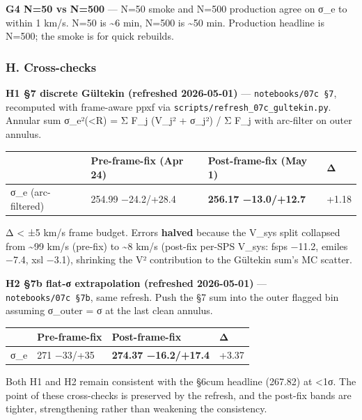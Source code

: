 \documentclass[
  10pt,
]{article}
\begin{document}
\textbf{G4 N=50 vs N=500} --- N=50 smoke and N=500 production agree on σ\_e to within 1 km/s. N=50 is \textasciitilde6 min, N=500 is \textasciitilde50 min. Production headline is N=500; the smoke is
for quick rebuilds.

\hypertarget{h.-cross-checks}{%
\subsubsection{H. Cross-checks}\label{h.-cross-checks}}

\textbf{H1 §7 discrete Gültekin (refreshed 2026-05-01)} --- \texttt{notebooks/07c\ §7}, recomputed with frame-aware ppxf via \texttt{scripts/refresh\_07c\_gultekin.py}. Annular sum σ\_e²(\textless R)
= Σ F\_j (V\_j² + σ\_j²) / Σ F\_j with arc-filter on outer annulus.

\begingroup\small\setlength{\tabcolsep}{4pt}\begin{longtable}[]{@{}llll@{}}
\toprule
& Pre-frame-fix (Apr 24) & Post-frame-fix (May 1) & Δ \\
\midrule
\endhead
σ\_e (arc-filtered) & 254.99 −24.2/+28.4 & \textbf{256.17 −13.0/+12.7} & +1.18 \\
\bottomrule
\end{longtable}\endgroup

Δ \textless{} ±5 km/s frame budget. Errors \textbf{halved} because the V\_sys split collapsed from \textasciitilde99 km/s (pre-fix) to \textasciitilde8 km/s (post-fix per-SPS V\_sys: fsps −11.2,
emiles −7.4, xsl −3.1), shrinking the V² contribution to the Gültekin sum's MC scatter.

\textbf{H2 §7b flat-σ extrapolation (refreshed 2026-05-01)} --- \texttt{notebooks/07c\ §7b}, same refresh. Push the §7 sum into the outer flagged bin assuming σ\_outer = σ at the last clean annulus.

\begingroup\small\setlength{\tabcolsep}{4pt}\begin{longtable}[]{@{}llll@{}}
\toprule
& Pre-frame-fix & Post-frame-fix & Δ \\
\midrule
\endhead
σ\_e & 271 −33/+35 & \textbf{274.37 −16.2/+17.4} & +3.37 \\
\bottomrule
\end{longtable}\endgroup

Both H1 and H2 remain consistent with the §6cum headline (267.82) at \textless1σ. The point of these cross-checks is preserved by the refresh, and the post-fix bands are tighter, strengthening rather
than weakening the consistency.
\end{document}
